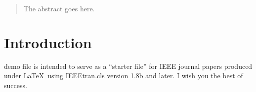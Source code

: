 \documentclass[journal]{IEEEtran}
\begin{document}







\maketitle

\begin{abstract}
The abstract goes here.
\end{abstract}







%
\IEEEpeerreviewmaketitle



\section{Introduction}
% 
% 
% 
% 
 demo file is intended to serve as a ``starter file''
for IEEE journal papers produced under \LaTeX\ using
IEEEtran.cls version 1.8b and later.
I wish you the best of success.
\end{document}
